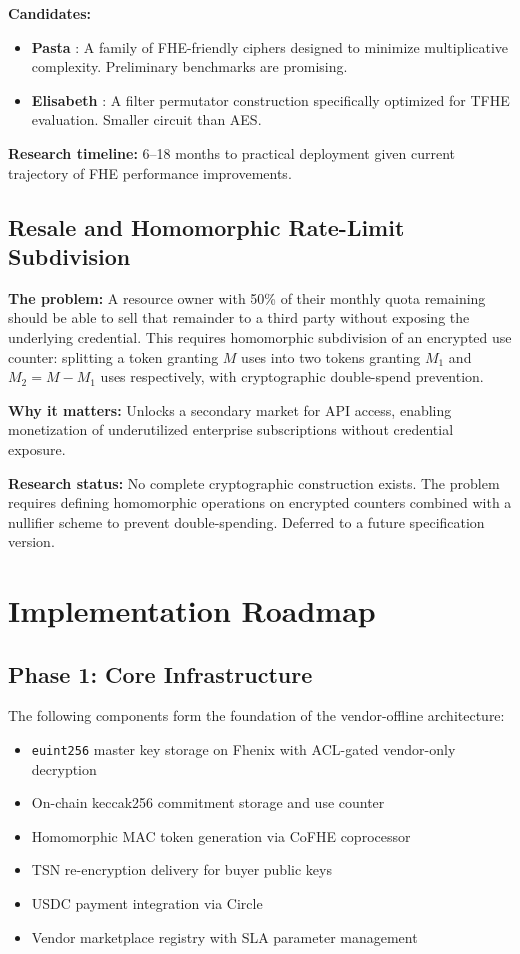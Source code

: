 \documentclass[conference]{IEEEtran}
\begin{document}
\textbf{Candidates:}
\begin{itemize}
\item \textbf{Pasta} \cite{pasta}: A family of FHE-friendly ciphers designed to
      minimize multiplicative complexity. Preliminary benchmarks are promising.
\item \textbf{Elisabeth} \cite{elisabeth}: A filter permutator construction
      specifically optimized for TFHE evaluation. Smaller circuit than AES.
\end{itemize}

\textbf{Research timeline:} 6--18 months to practical deployment given current
trajectory of FHE performance improvements.

\subsection{Resale and Homomorphic Rate-Limit Subdivision}

\textbf{The problem:} A resource owner with 50\% of their monthly quota remaining
should be able to sell that remainder to a third party without exposing the
underlying credential. This requires homomorphic subdivision of an encrypted use
counter: splitting a token granting $M$ uses into two tokens granting $M_1$ and
$M_2 = M - M_1$ uses respectively, with cryptographic double-spend prevention.

\textbf{Why it matters:} Unlocks a secondary market for API access, enabling
monetization of underutilized enterprise subscriptions without credential exposure.

\textbf{Research status:} No complete cryptographic construction exists. The
problem requires defining homomorphic operations on encrypted counters combined
with a nullifier scheme to prevent double-spending. Deferred to a future
specification version.

\section{Implementation Roadmap}
\label{sec:roadmap}

\subsection{Phase 1: Core Infrastructure}
The following components form the foundation of the vendor-offline architecture:
\begin{itemize}
\item \texttt{euint256} master key storage on Fhenix with ACL-gated
      vendor-only decryption
\item On-chain keccak256 commitment storage and use counter
\item Homomorphic MAC token generation via CoFHE coprocessor
\item TSN re-encryption delivery for buyer public keys
\item USDC payment integration via Circle
\item Vendor marketplace registry with SLA parameter management
\end{itemize}
\end{document}
